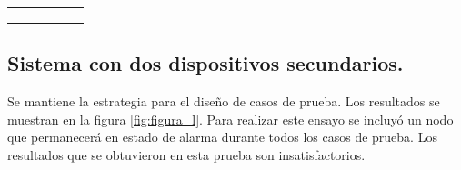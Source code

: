 \begin{table}[h]
\begin{tabular}{clcllc}
                                                                  &                                                                                   &                          & \multicolumn{2}{l}{}                                                                                                                                                                                                                                                                                            &                                                                                                                          \\
                                                                  &                                                                                   &                          & \multicolumn{2}{l}{}                                                                                                                                                                                                                                                                                            &                                                                                                                          \\
\multicolumn{1}{l}{}                                              &                                                                                   & \multicolumn{1}{l}{}     &                                                                                                                                                        &                                                                                                                                                        & \multicolumn{1}{l}{}                                                                                                    
\\
\bottomrule
\hline                                                                        
\end{tabular}
\label{tab:tabla_4_2}
\end{table}

\subsection{Sistema con dos dispositivos secundarios.}

Se mantiene la estrategia para el diseño de casos de prueba. Los resultados se muestran en la figura \ref{fig:figura_l}. Para realizar este ensayo se incluyó un nodo que permanecerá en estado de alarma durante todos los casos de prueba. Los resultados que se obtuvieron en esta prueba son insatisfactorios.

